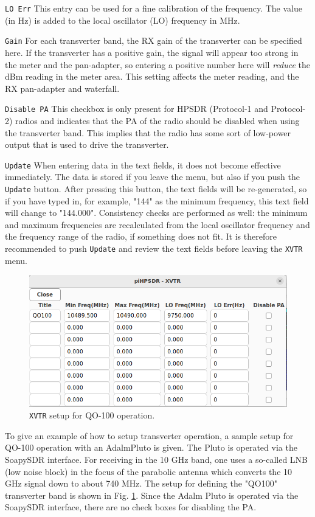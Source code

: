 \documentclass[12pt]{book}
\def\rett#1{\texttt{\color{red}#1}}
\def\bltt#1{\texttt{\color{blue}#1}}
\begin{document}
\rett{LO Err} This entry can be used for a fine calibration of the frequency. The value
(in Hz) is added to the local oscillator (LO) frequency in MHz.

\rett{Gain} For each transverter band, the RX gain of the transverter can be specified here.
If the transverter has a positive gain, the signal will appear too strong in the
meter and the pan-adapter, so
entering a positive number here will \textit{reduce} the dBm reading in the meter area.
This setting affects the meter reading, and the RX pan-adapter and waterfall.

\rett{Disable PA} This checkbox is only present for HPSDR (Protocol-1 and Protocol-2) radios and
indicates that the PA of the radio should be disabled
when using the transverter band. This implies that the radio has some sort of
low-power output that is used to drive the transverter.

\rett{Update} When entering data in the text fields, it does not become effective
immediately. The data is stored if you leave the menu, but also if you push the
\rett{Update} button. After pressing this button, the text fields will be re-generated,
so if you have typed in, for example, "144" as the minimum frequency, this text field
will change to "144.000". Consistency checks are performed as well: the minimum and maximum
frequencies are recalculated from the local oscillator frequency and the frequency range
of the radio, if something does not fit. It is therefore recommended to push
\rett{Update} and review the text fields before leaving the \bltt{XVTR} menu.

\begin{figure}[h!]
\center
\includegraphics[width=12cm]{QO100-XVTR.png}
\caption{\bltt{XVTR} setup for QO-100 operation.}
\label{fig:QO100-XVTR}
\end{figure}

To give an example of how to setup transverter operation, a sample setup for QO-100 operation
with an AdalmPluto is given.
The Pluto is
operated via the SoapySDR interface. For receiving in the 10 GHz band, one uses a so-called
LNB (low noise block) in the focus of the parabolic antenna which converts the 10 GHz signal down
to about 740 MHz. The setup for defining the "QO100" transverter band is shown in Fig.
\ref{fig:QO100-XVTR}. Since the Adalm Pluto is operated via the SoapySDR interface, there are no check boxes
for disabling the PA.
\end{document}
